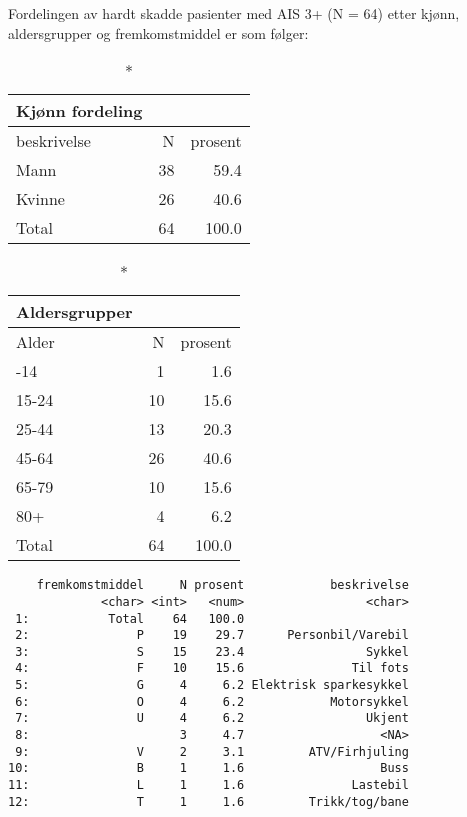 \documentclass[
  letterpaper,
  DIV=11,
  numbers=noendperiod]{scrartcl}
\begin{document}
Fordelingen av hardt skadde pasienter med AIS 3+ (N = 64) etter kjønn,
aldersgrupper og fremkomstmiddel er som følger:

\begingroup
\fontsize{12.0pt}{14.4pt}\selectfont
\begin{longtable*}{lrr}
\caption*{
{\large Kjønn fordeling}
} \\ 
\toprule
beskrivelse & N & prosent \\ 
\midrule\addlinespace[2.5pt]
Mann & 38 & 59.4 \\ 
Kvinne & 26 & 40.6 \\ 
Total & 64 & 100.0 \\ 
\bottomrule
\end{longtable*}
\endgroup

\begingroup
\fontsize{12.0pt}{14.4pt}\selectfont
\begin{longtable*}{lrr}
\caption*{
{\large Aldersgrupper}
} \\ 
\toprule
Alder & N & prosent \\ 
\midrule{}-14 & 1 & 1.6 \\ 
15-24 & 10 & 15.6 \\ 
25-44 & 13 & 20.3 \\ 
45-64 & 26 & 40.6 \\ 
65-79 & 10 & 15.6 \\ 
80+ & 4 & 6.2 \\ 
Total & 64 & 100.0 \\ 
\bottomrule
\end{longtable*}
\endgroup

\begin{verbatim}
    fremkomstmiddel     N prosent            beskrivelse
             <char> <int>   <num>                 <char>
 1:           Total    64   100.0                       
 2:               P    19    29.7      Personbil/Varebil
 3:               S    15    23.4                 Sykkel
 4:               F    10    15.6               Til fots
 5:               G     4     6.2 Elektrisk sparkesykkel
 6:               O     4     6.2            Motorsykkel
 7:               U     4     6.2                 Ukjent
 8:                     3     4.7                   <NA>
 9:               V     2     3.1         ATV/Firhjuling
10:               B     1     1.6                   Buss
11:               L     1     1.6               Lastebil
12:               T     1     1.6         Trikk/tog/bane
\end{verbatim}
\end{document}
